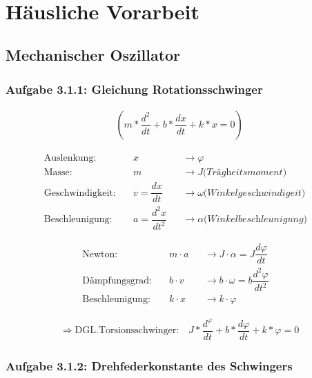 \documentclass[a4paper]{scrartcl}
\def\header#1#2{
  \begin{center}
    {\Large #1}\\
    {#2}
  \end{center}
}
\numberwithin{equation}{subsection}
\begin{document}
\vspace{10pt}
\header{\HEADDING}{\SUBHEADDING}

\tableofcontents

\newpage

\section{Häusliche Vorarbeit}
\subsection{Mechanischer Oszillator}
\subsubsection{Aufgabe 3.1.1: Gleichung Rotationsschwinger}

\begin{align}
(m*\dfrac{d^2}{dt} + b*\dfrac{dx}{dt} + k*x = 0)
\end{align}

\begin{align*}
\text{Auslenkung:}& \quad x 							&&\longrightarrow \varphi \\
\text{Masse:}& \quad m   							&&\longrightarrow J \textit{(Trägheitsmoment)} &\\
\text{Geschwindigkeit:}& \quad v=\dfrac{dx}{dt} 		&&\longrightarrow \omega \textit{(Winkelgeschwindigeit)}&\\
\text{Beschleunigung:}& \quad a=\dfrac{d^2x}{dt^2} 	&&\longrightarrow \alpha \textit{(Winkelbeschleunigung)}&
\end{align*}

\begin{align*}
\text{Newton:}& \quad m \cdot a  		&&\longrightarrow J \cdot \alpha = J \dfrac{d\varphi}{dt} &\\
\text{Dämpfungsgrad:}& \quad b \cdot v  	&&\longrightarrow b \cdot \omega = b \dfrac{d^2\varphi}{dt^2} &\\
\text{Beschleunigung:}& \quad k \cdot x 	&&\longrightarrow k \cdot \varphi &
\end{align*}

\begin{align}
\Rightarrow \text{DGL.Torsionsschwinger:} \quad J*\dfrac{d^\varphi}{dt} + b*\dfrac{d\varphi}{dt} + k*\varphi = 0
\end{align}

\subsubsection{Aufgabe 3.1.2: Drehfederkonstante des Schwingers}
\end{document}
